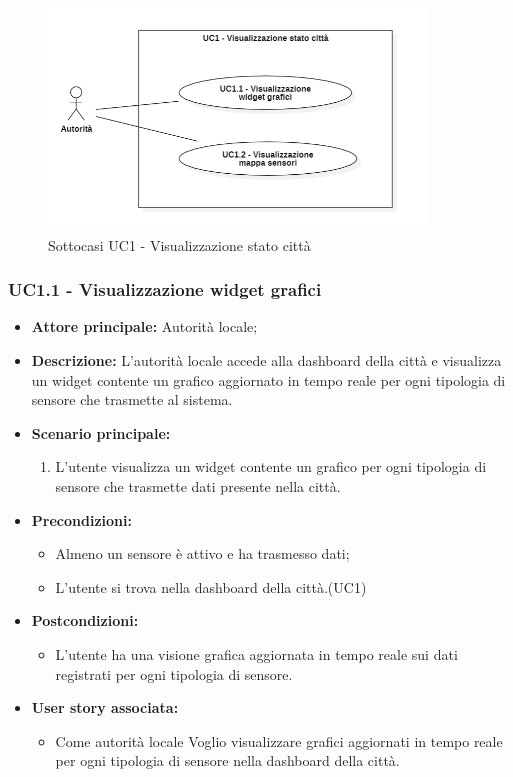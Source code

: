 \documentclass{article}
\begin{document}
\begin{figure}[H]
    \centering
    \includegraphics[width=0.9\textwidth]{Images/uc1_Subcase.PNG} 
    \caption{Sottocasi UC1 - Visualizzazione stato città}
    \label{fig:UC1_sub}
\end{figure}

\subsubsection{UC1.1 - Visualizzazione widget grafici}
\begin{itemize}
    \item \textbf{Attore principale:} Autorità locale;
    \item \textbf{Descrizione:} L'autorità locale accede alla dashboard della città e visualizza un widget contente un grafico aggiornato in tempo reale per ogni tipologia di sensore che trasmette al sistema.
    \item \textbf{Scenario principale:}
          \begin{enumerate}
              \item L'utente visualizza un widget contente un grafico per ogni tipologia di sensore che trasmette dati presente nella città.
          \end{enumerate}
    \item \textbf{Precondizioni:}
          \begin{itemize}
              \item  Almeno un sensore è attivo e ha trasmesso dati;
              \item L'utente si trova nella dashboard della città.(UC1)
          \end{itemize}
    \item \textbf{Postcondizioni:}
          \begin{itemize}
              \item      L'utente ha una visione grafica aggiornata in tempo reale sui dati registrati per ogni tipologia di sensore.
          \end{itemize}
    \item \textbf{User story associata:}
          \begin{itemize}
              \item Come autorità locale
                    Voglio visualizzare grafici aggiornati in tempo reale per ogni tipologia di sensore nella dashboard della città.
          \end{itemize}

\end{itemize}
\end{document}
